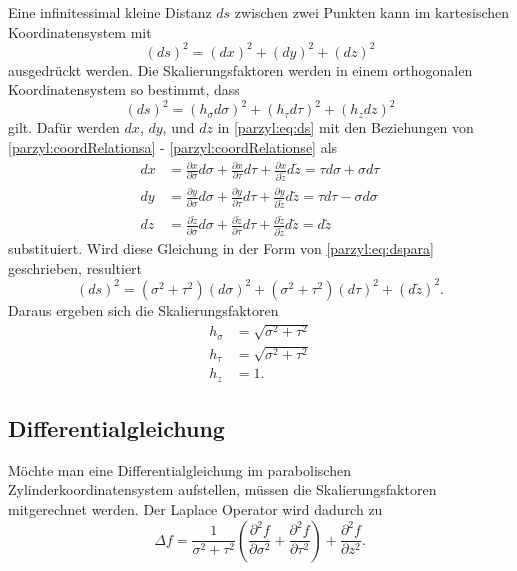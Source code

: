 Eine infinitessimal kleine Distanz $ds$ zwischen zwei Punkten
kann im kartesischen Koordinatensystem mit
\begin{equation}
    \left(ds\right)^2 = \left(dx\right)^2 + \left(dy\right)^2 + 
    \left(dz\right)^2
    \label{parzyl:eq:ds}
\end{equation}
ausgedrückt werden.
Die Skalierungsfaktoren werden in einem orthogonalen Koordinatensystem so bestimmt, dass
\begin{equation}
    \left(ds\right)^2 = \left(h_{\sigma}d\sigma\right)^2 + 
    \left(h_{\tau}d\tau\right)^2 + \left(h_z dz\right)^2
\label{parzyl:eq:dspara}
\end{equation}
gilt.
Dafür werden $dx$, $dy$, und $dz$ in \eqref{parzyl:eq:ds} mit den Beziehungen
von \eqref{parzyl:coordRelationsa} - \eqref{parzyl:coordRelationse} als
\begin{align}
    dx  &= \frac{\partial x }{\partial \sigma} d\sigma + 
        \frac{\partial x }{\partial \tau} d\tau + 
        \frac{\partial x }{\partial \tilde{z}} d \tilde{z} 
        = \tau d\sigma + \sigma d \tau \\
    dy &= \frac{\partial y }{\partial \sigma} d\sigma + 
        \frac{\partial y }{\partial \tau} d\tau +
        \frac{\partial y }{\partial \tilde{z}} d \tilde{z} 
        = \tau d\tau - \sigma d \sigma \\
    dz &= \frac{\partial \tilde{z} }{\partial \sigma} d\sigma + 
        \frac{\partial \tilde{z} }{\partial \tau} d\tau +
        \frac{\partial \tilde{z} }{\partial \tilde{z}} d \tilde{z} 
        = d \tilde{z}
\end{align}
substituiert.
Wird diese Gleichung in der Form von \eqref{parzyl:eq:dspara}
geschrieben, resultiert
\begin{equation}
    \left(d s\right)^2 = 
        \left(\sigma^2 + \tau^2\right)\left(d\sigma\right)^2 + 
        \left(\sigma^2 + \tau^2\right)\left(d\tau\right)^2 +
        \left(d \tilde{z}\right)^2.
\end{equation}
Daraus ergeben sich die Skalierungsfaktoren 
\begin{align}
    h_{\sigma} &= \sqrt{\sigma^2 + \tau^2}\\
    h_{\tau} &= \sqrt{\sigma^2 + \tau^2}\\
    h_{z} &= 1.
\end{align}
\subsection{Differentialgleichung}
Möchte man eine Differentialgleichung im parabolischen 
Zylinderkoordinatensystem aufstellen, müssen die Skalierungsfaktoren
mitgerechnet werden.
Der Laplace Operator wird dadurch zu
\begin{equation}
    \Delta f = \frac{1}{\sigma^2 + \tau^2} 
        \left( 
            \frac{\partial^2 f}{\partial \sigma ^2} +
            \frac{\partial^2 f}{\partial \tau ^2}
        \right)
        + \frac{\partial^2 f}{\partial z^2}.
    \label{parzyl:eq:laplaceInParZylCor}
\end{equation}
